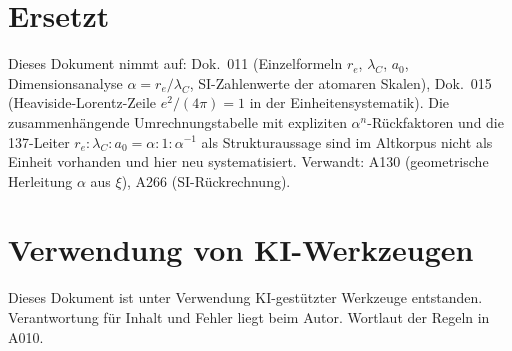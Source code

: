 \section{Ersetzt}

Dieses Dokument nimmt auf: Dok.~011 (Einzelformeln $r_e$, $\lambda_C$, $a_0$,
Dimensionsanalyse $\alpha=r_e/\lambda_C$, SI-Zahlenwerte der atomaren Skalen),
Dok.~015 (Heaviside-Lorentz-Zeile $e^2/(4\pi)=1$ in der Einheitensystematik).
Die zusammenhängende Umrechnungstabelle mit expliziten $\alpha^n$-Rückfaktoren
und die 137-Leiter $r_e:\lambda_C:a_0=\alpha:1:\alpha^{-1}$ als Strukturaussage
sind im Altkorpus nicht als Einheit vorhanden und hier neu systematisiert.
Verwandt: A130 (geometrische Herleitung $\alpha$ aus $\xi$), A266 (SI-Rückrechnung).

\section{Verwendung von KI-Werkzeugen}

Dieses Dokument ist unter Verwendung KI-gestützter Werkzeuge entstanden.
Verantwortung für Inhalt und Fehler liegt beim Autor. Wortlaut der Regeln in A010.
